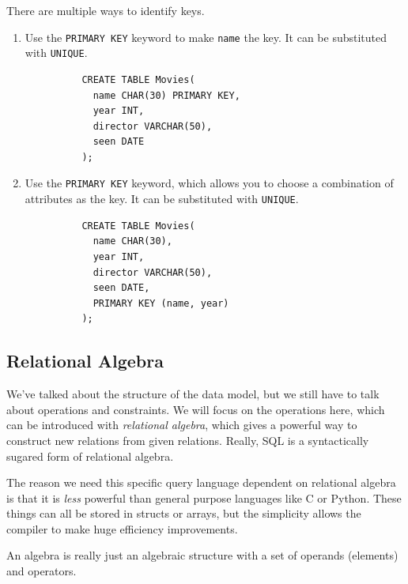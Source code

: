 \documentclass{article}
\begin{document}
    \begin{theorem}
      There are multiple ways to identify keys. 
      \begin{enumerate}
        \item Use the \texttt{PRIMARY KEY} keyword to make \texttt{name} the key. It can be substituted with \texttt{UNIQUE}. 
        \begin{lstlisting}
          CREATE TABLE Movies(
            name CHAR(30) PRIMARY KEY,
            year INT, 
            director VARCHAR(50), 
            seen DATE
          ); 
        \end{lstlisting}

        \item Use the \texttt{PRIMARY KEY} keyword, which allows you to choose a combination of attributes as the key. It can be substituted with \texttt{UNIQUE}. 
        \begin{lstlisting}
          CREATE TABLE Movies(
            name CHAR(30),
            year INT, 
            director VARCHAR(50), 
            seen DATE, 
            PRIMARY KEY (name, year)
          ); 
        \end{lstlisting}
      \end{enumerate}
    \end{theorem}

  \subsection{Relational Algebra}

    We've talked about the structure of the data model, but we still have to talk about operations and constraints. We will focus on the operations here, which can be introduced with \textit{relational algebra}, which gives a powerful way to construct new relations from given relations. Really, SQL is a syntactically sugared form of relational algebra. 

    The reason we need this specific query language dependent on relational algebra is that it is \textit{less} powerful than general purpose languages like C or Python. These things can all be stored in structs or arrays, but the simplicity allows the compiler to make huge efficiency improvements. 

    An algebra is really just an algebraic structure with a set of operands (elements) and operators.  
\end{document}
